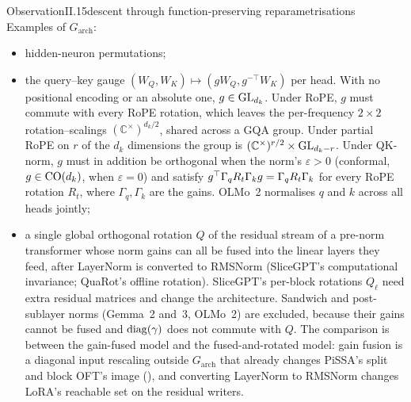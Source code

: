 \begin{restate}{Observation}{II.15}{descent through function-preserving reparametrisations}
Examples of $G_{\mathrm{arch}}$:
\begin{itemize}
  \item hidden-neuron permutations;
  \item the query--key gauge $(W_Q,W_K)\mapsto(gW_Q,g^{-\top}W_K)$ per head. With no positional encoding or an absolute
    one, $g\in\mathrm{GL}_{d_k}$. Under RoPE, $g$ must commute with every RoPE rotation, which leaves the per-frequency $2\times2$
    rotation--scalings $(\mathbb C^\times)^{d_k/2}$, shared across a GQA group. Under partial RoPE on $r$ of the $d_k$
    dimensions the group is $(\mathbb C^\times)^{r/2}\times\mathrm{GL}_{d_k-r}$. Under QK-norm, $g$ must in addition be
    orthogonal when the norm's $\varepsilon>0$ (conformal, $g\in\mathrm{CO}(d_k)$, when $\varepsilon=0$) and satisfy
    $g^{\top}\Gamma_qR_t\Gamma_kg=\Gamma_qR_t\Gamma_k$ for every RoPE rotation $R_t$, where $\Gamma_q,\Gamma_k$ are the gains.
    OLMo~2 normalises $q$ and $k$ across all heads jointly;
  \item a single global orthogonal rotation $Q$ of the residual stream of a pre-norm transformer whose norm gains can all
    be fused into the linear layers they feed, after LayerNorm is converted to RMSNorm (SliceGPT's computational
    invariance; QuaRot's offline rotation). SliceGPT's per-block rotations $Q_\ell$ need extra residual matrices and
    change the architecture. Sandwich and post-sublayer norms (Gemma~2 and~3, OLMo~2) are excluded, because their gains
    cannot be fused and $\operatorname{diag}(\gamma)$ does not commute with $Q$. The comparison is between the gain-fused model and the
    fused-and-rotated model: gain fusion is a diagonal input rescaling outside $G_{\mathrm{arch}}$ that already changes
    PiSSA's split and block OFT's image (), and converting LayerNorm to RMSNorm changes LoRA's
    reachable set on the residual writers.
\end{itemize}
\end{restate}

